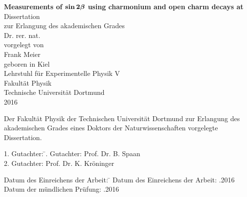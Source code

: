 
\thispagestyle{empty}
\vspace*{4.0cm}

\begin{center}
\Huge\textbf{
  Measurements of $\boldsymbol{\sin 2\beta}$ using charmonium and open charm decays at \lhcb
}
\vfill
\Large
Dissertation \\ zur Erlangung des akademischen Grades \\ Dr. rer. nat. \\
\vspace{20pt}
\normalsize
vorgelegt von \\[5pt]
{\Large Frank Meier} \\[5pt]
geboren in Kiel \\
\vspace{20pt}
Lehrstuhl f\"ur Experimentelle Physik V \\ Fakult\"at Physik \\
Technische Universit\"at Dortmund \\ 2016

\end{center}
\newpage



\thispagestyle{empty}
\vspace*{\fill}
\noindent
Der Fakultät Physik der Technischen Universität Dortmund zur Erlangung des akademischen Grades eines Doktors der Naturwissenschaften vorgelegte Dissertation.
\begin{tabbing}
1. Gutachter: \=. Gutachter: \>Prof. Dr. B. Spaan \\
2. Gutachter: \>Prof. Dr. K. Kröninger
\end{tabbing}
\begin{tabbing}
Datum des Einreichens der Arbeit: \=\kill
Datum des Einreichens der Arbeit: .2016\\
Datum der mündlichen Prüfung: .2016
\end{tabbing}
\newpage

